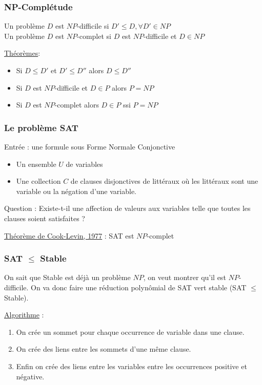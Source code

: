 \documentclass{article}
\begin{document}
      \subsubsection{NP-Complétude}

      Un problème $D$ est $NP$-difficile si $D' \leq D, \forall D' \in NP$ \\
      Un problème $D$ est $NP$-complet si $D$ est $NP$-difficile et $D \in NP$

      \underline{Théorèmes}:
      \begin{itemize}
        \item Si $D \leq D'$ et $D' \leq D''$ alors $D \leq D''$
        \item Si $D$ est $NP$-difficile et $D \in P$ alors $P = NP$
        \item Si $D$ est $NP$-complet alors $D \in P$ ssi $P = NP$
      \end{itemize}

      \subsubsection{Le problème SAT}

      Entrée : une formule sous Forme Normale Conjonctive
      \begin{itemize}
        \item Un ensemble $U$ de variables
        \item Une collection $C$ de clauses disjonctives de littéraux où les
          littéraux sont une variable ou la négation d'une variable.
      \end{itemize}
      Question : Existe-t-il une affection de valeurs aux variables telle que
      toutes les clauses soient satisfaites ?

      \underline{Théorème de Cook-Levin, 1977} : SAT est $NP$-complet

      \subsubsection{SAT $\leq$ Stable}

        On sait que Stable est déjà un problème $NP$, on veut montrer qu'il est
        $NP$-difficile. On va donc faire une réduction polynômial de SAT vert
        stable (SAT $\leq$ Stable).

        \underline{Algorithme} :

        \begin{enumerate}
          \item On crée un sommet pour chaque occurrence de variable dans une
            clause.
          \item On crée des liens entre les sommets d'une même clause.
          \item Enfin on crée des liens entre les variables entre les
            occurrences positive et négative.
        \end{enumerate}
\end{document}
